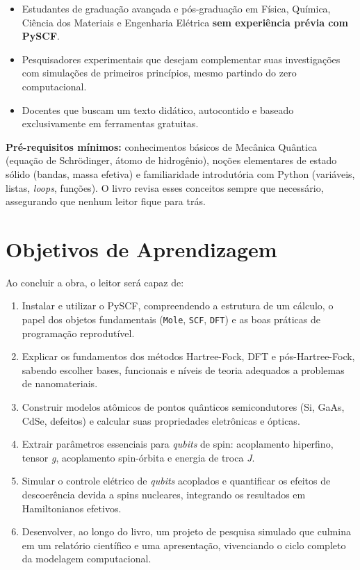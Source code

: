 \documentclass[12pt,a4paper]{article}
\begin{document}
	\begin{itemize}
		\item Estudantes de graduação avançada e pós-graduação em Física, Química, Ciência dos Materiais e Engenharia Elétrica \textbf{sem experiência prévia com PySCF}.
		\item Pesquisadores experimentais que desejam complementar suas investigações com simulações de primeiros princípios, mesmo partindo do zero computacional.
		\item Docentes que buscam um texto didático, autocontido e baseado exclusivamente em ferramentas gratuitas.
	\end{itemize}
	
	\textbf{Pré-requisitos mínimos:} conhecimentos básicos de Mecânica Quântica (equação de Schrödinger, átomo de hidrogênio), noções elementares de estado sólido (bandas, massa efetiva) e familiaridade introdutória com Python (variáveis, listas, \emph{loops}, funções). O livro revisa esses conceitos sempre que necessário, assegurando que nenhum leitor fique para trás.
	
	\section{Objetivos de Aprendizagem}
	
	Ao concluir a obra, o leitor será capaz de:
	
	\begin{enumerate}[label=\arabic*.]
		\item Instalar e utilizar o PySCF, compreendendo a estrutura de um cálculo, o papel dos objetos fundamentais (\texttt{Mole}, \texttt{SCF}, \texttt{DFT}) e as boas práticas de programação reprodutível.
		\item Explicar os fundamentos dos métodos Hartree-Fock, DFT e pós-Hartree-Fock, sabendo escolher bases, funcionais e níveis de teoria adequados a problemas de nanomateriais.
		\item Construir modelos atômicos de pontos quânticos semicondutores (Si, GaAs, CdSe, defeitos) e calcular suas propriedades eletrônicas e ópticas.
		\item Extrair parâmetros essenciais para \emph{qubits} de spin: acoplamento hiperfino, tensor \emph{g}, acoplamento spin-órbita e energia de troca \emph{J}.
		\item Simular o controle elétrico de \emph{qubits} acoplados e quantificar os efeitos de descoerência devida a spins nucleares, integrando os resultados em Hamiltonianos efetivos.
		\item Desenvolver, ao longo do livro, um projeto de pesquisa simulado que culmina em um relatório científico e uma apresentação, vivenciando o ciclo completo da modelagem computacional.
	\end{enumerate}
	
\end{document}
